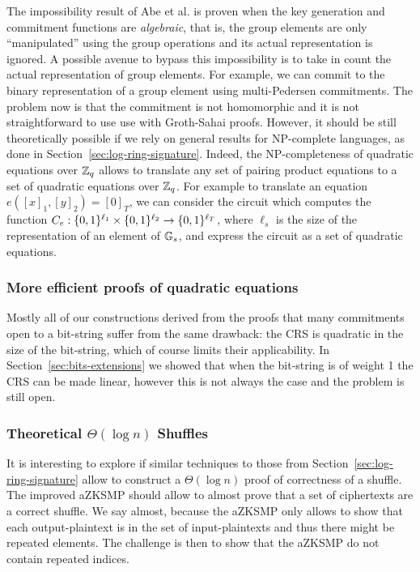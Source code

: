 The impossibility result of Abe et al. is proven when the key generation and commitment functions are \emph{algebraic}, that is, the group elements are only ``manipulated'' using the group operations and its actual representation is ignored.
A possible avenue to bypass this impossibility is to take in count the actual representation of group elements. For example, we can commit to the binary representation of a group element using multi-Pedersen commitments. The problem now is that the commitment is not homomorphic and it is not straightforward to use use with Groth-Sahai proofs. However, it should be still theoretically possible if we rely on general results for NP-complete languages, as done in Section~\ref{sec:log-ring-signature}.
Indeed, the NP-completeness of quadratic equations over $\mathbb{Z}_q$ allows to translate any set of pairing product equations to a set of quadratic equations over $\mathbb{Z}_q$. For example to translate an equation $e([x]_1,[y]_2)=[0]_T$, we can consider the circuit which computes the function $C_e:\{0,1\}^{\ell_1}\times \{0,1\}^{\ell_2} \to\{0,1\}^{\ell_T}$, where $\ell_s$ is the size of the representation of an element of $\mathbb{G}_s$, and express the circuit as a set of quadratic equations.

\subsubsection{More efficient proofs of quadratic equations}
Mostly all of our constructions derived from the proofs that many commitments open to a bit-string suffer from the same drawback: the CRS is quadratic in the size of the bit-string, which of course limits their applicability. In Section~\ref{sec:bits-extensions} we showed that when the bit-string is of weight 1 the CRS can be made linear, however this is not always the case and the problem is still open.
 
\subsubsection{Theoretical $\Theta(\log n)$ Shuffles}
It is interesting to explore if similar techniques to those from Section~\ref{sec:log-ring-signature} allow to construct a $\Theta(\log n)$ proof of correctness of a shuffle. The improved aZKSMP should allow to almost prove that a set of ciphertexts are a correct shuffle. We say almost, because the aZKSMP only allows to show that each output-plaintext is in the set of input-plaintexts and thus there might be repeated elements. The challenge is then to show that the aZKSMP do not contain repeated indices.

